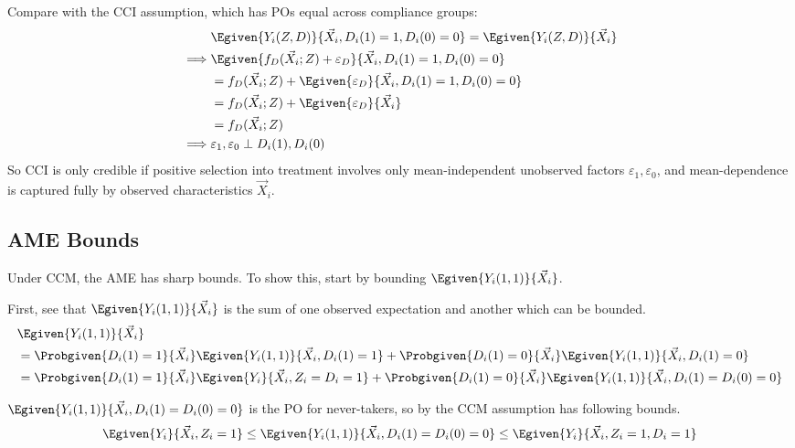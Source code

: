 Compare with the CCI assumption, which has POs equal across compliance groups:
\begin{align*}
    &\Egiven{Y_i(Z,D)}{\vec X_i, D_i(1)=1, D_i(0)=0}
    = \Egiven{Y_i(Z,D)}{\vec X_i} \\
    \implies&
        \Egiven{f_D(\vec X_i ; Z) + \varepsilon_D}{\vec X_i,
            D_i(1)=1, D_i(0)=0} \\
    &= f_D(\vec X_i ; Z) + \Egiven{\varepsilon_D}{\vec X_i,
        D_i(1)=1, D_i(0)=0} \\
    &= f_D(\vec X_i ; Z) + \Egiven{\varepsilon_D}{\vec X_i} \\
    &= f_D(\vec X_i ; Z) \\
    \implies& \varepsilon_1, \varepsilon_0 \perp D_i(1), D_i(0)
\end{align*}
So CCI is only credible if positive selection into treatment involves only mean-independent unobserved factors $\varepsilon_1, \varepsilon_0$, and mean-dependence is captured fully by observed characteristics $\vec X_i$.

\subsection{AME Bounds}
\label{sec:ame-bounds}

Under CCM, the AME has sharp bounds.
To show this, start by bounding $\Egiven{Y_i(1,1)}{\vec X_i}$.

First, see that $\Egiven{Y_i(1,1)}{\vec X_i}$ is the sum of one observed expectation and another which can be bounded.
\begin{align*}
    &\Egiven{Y_i(1,1)}{\vec X_i} \\
    &=
    \Probgiven{D_i(1) = 1}{\vec X_i }
        \Egiven{Y_i(1,1)}{\vec X_i, D_i(1) = 1}
    + \Probgiven{D_i(1) = 0}{\vec X_i }
        \Egiven{Y_i(1,1)}{\vec X_i, D_i(1) = 0} \\
    &=
    \Probgiven{D_i(1) = 1}{\vec X_i }
        \Egiven{Y_i}{\vec X_i, Z_i = D_i = 1}
    + \Probgiven{D_i(1) = 0}{\vec X_i }
        \Egiven{Y_i(1,1)}{\vec X_i, D_i(1) = D_i(0) = 0}
\end{align*}

$\Egiven{Y_i(1,1)}{\vec X_i, D_i(1) = D_i(0) = 0}$ is the PO for never-takers, so by the CCM assumption has following bounds.
\[
    \Egiven{Y_i}{\vec X_i, Z_i = 1} 
    \leq 
    \Egiven{Y_i(1,1)}{\vec X_i, D_i(1) = D_i(0) = 0} 
    \leq 
    \Egiven{Y_i}{\vec X_i, Z_i = 1, D_i = 1}
\]

